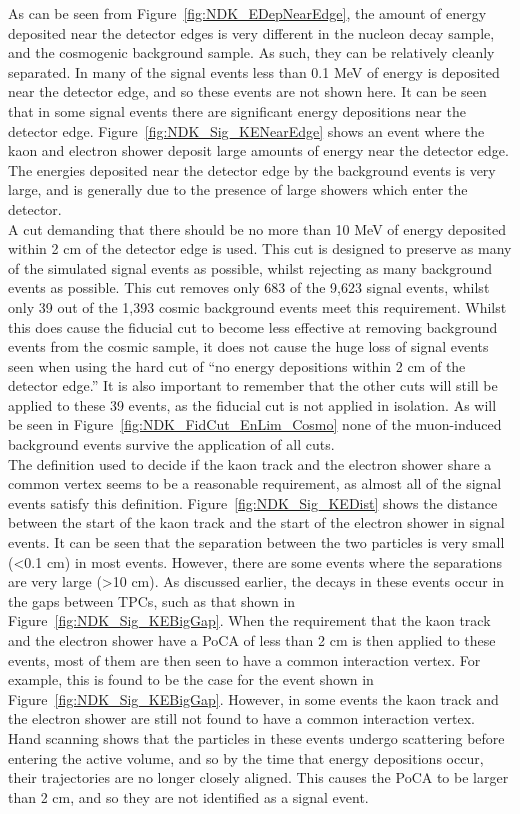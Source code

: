 As can be seen from Figure~\ref{fig:NDK_EDepNearEdge}, the amount of energy deposited near the detector edges is very different in the nucleon decay sample, and the cosmogenic background sample. As such, they can be relatively cleanly separated. In many of the signal events less than 0.1 MeV of energy is deposited near the detector edge, and so these events are not shown here. It can be seen that in some signal events there are significant energy depositions near the detector edge. Figure~\ref{fig:NDK_Sig_KENearEdge} shows an event where the kaon and electron shower deposit large amounts of energy near the detector edge. The energies deposited near the detector edge by the background events is very large, and is generally due to the presence of large showers which enter the detector. \\

A cut demanding that there should be no more than 10 MeV of energy deposited within 2 cm of the detector edge is used. This cut is designed to preserve as many of the simulated signal events as possible, whilst rejecting as many background events as possible. This cut removes only 683 of the 9,623 signal events, whilst only 39 out of the 1,393 cosmic background events meet this requirement. Whilst this does cause the fiducial cut to become less effective at removing background events from the cosmic sample, it does not cause the huge loss of signal events seen when using the hard cut of ``no energy depositions within 2 cm of the detector edge.'' It is also important to remember that the other cuts will still be applied to these 39 events, as the fiducial cut is not applied in isolation. As will be seen in Figure~\ref{fig:NDK_FidCut_EnLim_Cosmo} none of the muon-induced background events survive the application of all cuts. \\

The definition used to decide if the kaon track and the electron shower share a common vertex seems to be a reasonable requirement, as almost all of the signal events satisfy this definition. Figure~\ref{fig:NDK_Sig_KEDist} shows the distance between the start of the kaon track and the start of the electron shower in signal events. It can be seen that the separation between the two particles is very small (<0.1 cm) in most events. However, there are some events where the separations are very large (>10 cm). As discussed earlier, the decays in these events occur in the gaps between TPCs, such as that shown in Figure~\ref{fig:NDK_Sig_KEBigGap}. When the requirement that the kaon track and the electron shower have a PoCA of less than 2 cm is then applied to these events, most of them are then seen to have a common interaction vertex. For example, this is found to be the case for the event shown in Figure~\ref{fig:NDK_Sig_KEBigGap}. However, in some events the kaon track and the electron shower are still not found to have a common interaction vertex. Hand scanning shows that the particles in these events undergo scattering before entering the active volume, and so by the time that energy depositions occur, their trajectories are no longer closely aligned. This causes the PoCA to be larger than 2 cm, and so they are not identified as a signal event. \\

